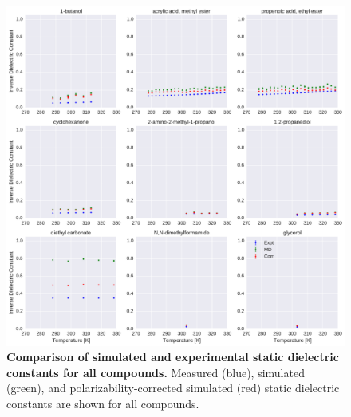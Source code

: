 \documentclass[aip, jcp, reprint]{revtex4-1}  %
\begin{document}
\begin{figure}[alldielectric]

\includegraphics[width=\textwidth]{./figures/dielectric_versus_temperature_part0.pdf}

\caption{{\bf Comparison of simulated and experimental static dielectric constants for all compounds.}
Measured (blue), simulated (green), and polarizability-corrected simulated (red) static dielectric constants are shown for all compounds.
}

\label{figure:AllDielectrics}

\end{figure}
\end{document}
